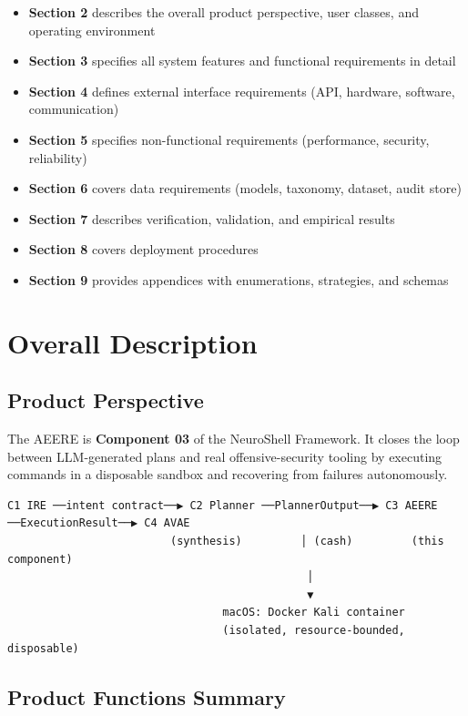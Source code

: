 \documentclass[10pt,journal,onecolumn]{IEEEtran}
\begin{document}
\begin{itemize}
\item \textbf{Section 2} describes the overall product perspective, user classes, and operating environment
\item \textbf{Section 3} specifies all system features and functional requirements in detail
\item \textbf{Section 4} defines external interface requirements (API, hardware, software, communication)
\item \textbf{Section 5} specifies non-functional requirements (performance, security, reliability)
\item \textbf{Section 6} covers data requirements (models, taxonomy, dataset, audit store)
\item \textbf{Section 7} describes verification, validation, and empirical results
\item \textbf{Section 8} covers deployment procedures
\item \textbf{Section 9} provides appendices with enumerations, strategies, and schemas
\end{itemize}

\section{Overall Description}

\subsection{Product Perspective}

The AEERE is \textbf{Component 03} of the NeuroShell Framework. It closes the loop between LLM-generated plans and real offensive-security tooling by executing commands in a disposable sandbox and recovering from failures autonomously.

\begin{lstlisting}
C1 IRE ──intent contract──▶ C2 Planner ──PlannerOutput──▶ C3 AEERE ──ExecutionResult──▶ C4 AVAE
                         (synthesis)         │ (cash)         (this component)
                                              │
                                              ▼
                                 macOS: Docker Kali container
                                 (isolated, resource-bounded, disposable)
\end{lstlisting}

\subsection{Product Functions Summary}
\end{document}
